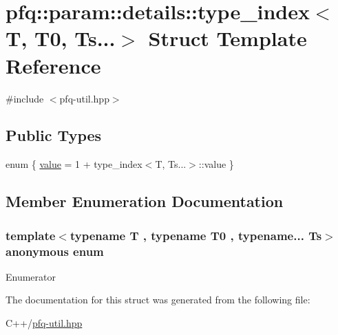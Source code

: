 \hypertarget{structpfq_1_1param_1_1details_1_1type__index_3_01T_00_01T0_00_01Ts_8_8_8_4}{\section{pfq\+:\+:param\+:\+:details\+:\+:type\+\_\+index$<$ T, T0, Ts...$>$ Struct Template Reference}
\label{structpfq_1_1param_1_1details_1_1type__index_3_01T_00_01T0_00_01Ts_8_8_8_4}
}


{\ttfamily \#include $<$pfq-\/util.\+hpp$>$}

\subsection*{Public Types}
\begin{DoxyCompactItemize}
\item 
enum \{ \hyperlink{structpfq_1_1param_1_1details_1_1type__index_3_01T_00_01T0_00_01Ts_8_8_8_4_a9107ca364fa02c631aa122a5756a88b8a462a8ffc60437747c76392be250281a1}{value} = 1 + type\+\_\+index$<$T, Ts...$>$\+:\+:value
 \}
\end{DoxyCompactItemize}


\subsection{Member Enumeration Documentation}
\hypertarget{structpfq_1_1param_1_1details_1_1type__index_3_01T_00_01T0_00_01Ts_8_8_8_4_a9107ca364fa02c631aa122a5756a88b8}{\subsubsection[{anonymous enum}]{\setlength{\rightskip}{0pt plus 5cm}template$<$typename T , typename T0 , typename... Ts$>$ anonymous enum}}\label{structpfq_1_1param_1_1details_1_1type__index_3_01T_00_01T0_00_01Ts_8_8_8_4_a9107ca364fa02c631aa122a5756a88b8}
\begin{Desc}
\item[Enumerator]\par
\begin{description}
\item[{\em 
\hypertarget{structpfq_1_1param_1_1details_1_1type__index_3_01T_00_01T0_00_01Ts_8_8_8_4_a9107ca364fa02c631aa122a5756a88b8a462a8ffc60437747c76392be250281a1}{value}\label{structpfq_1_1param_1_1details_1_1type__index_3_01T_00_01T0_00_01Ts_8_8_8_4_a9107ca364fa02c631aa122a5756a88b8a462a8ffc60437747c76392be250281a1}
}]\end{description}
\end{Desc}


The documentation for this struct was generated from the following file\+:\begin{DoxyCompactItemize}
\item 
C++/\hyperlink{pfq-util_8hpp}{pfq-\/util.\+hpp}\end{DoxyCompactItemize}
